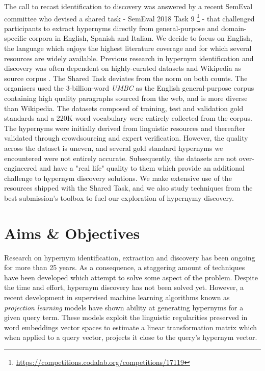 The call to recast identification to discovery was answered by a recent SemEval committee who devised a shared task - SemEval 2018 Task 9 \footnote{\url{https://competitions.codalab.org/competitions/17119}} - that challenged participants to extract hypernyms directly from general-purpose and domain-specific corpora in English, Spanish and Italian.  We decide to focus on English, the language which enjoys the highest literature coverage and for which several resources are widely available.  Previous research in hypernym identification and discovery was often dependent on highly-curated datasets and Wikipedia as source corpus \citep{Snow2004, shwartz2017siege, levy2015supervised, weeds2014learning}.  The Shared Task deviates from the norm on both counts.  The organisers used the 3-billion-word \textit{UMBC} as the English general-purpose corpus containing high quality paragraphs sourced from the web, and is more diverse than Wikipedia.  The datasets composed of training, test and validation gold standards and a 220K-word vocabulary were entirely collected from the corpus.  The hypernyms were initially derived from linguistic resources and thereafter validated through crowdsourcing and expert verification.  However, the quality across the dataset is uneven, and several gold standard hypernyms we encountered were not entirely accurate.  Subsequently, the datasets are not over-engineered and have a "real life" quality to them which provide an additional challenge to hypernym discovery solutions.  We make extensive use of the resources shipped with the Shared Task, and we also study techniques from the best submission's toolbox to fuel our exploration of hypernymy discovery.

\section{Aims \& Objectives}
Research on hypernym identification, extraction and discovery has been ongoing for more than 25 years.  As a consequence, a staggering amount of techniques have been developed which attempt to solve some aspect of the problem.  Despite the time and effort, hypernym discovery has not been solved yet.  However, a recent development in supervised machine learning algorithms known as \textit{projection learning} models have shown ability at generating hypernyms for a given query term.  These models exploit the  linguistic regularities preserved in word embeddings vector spaces to estimate a linear transformation matrix which when applied to a query vector, projects it close to the query's hypernym vector.

